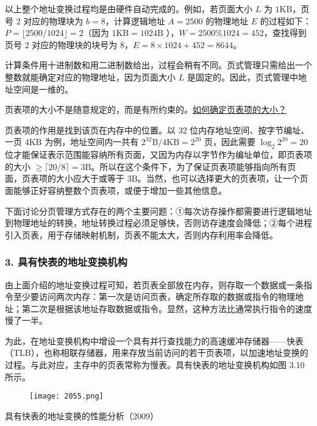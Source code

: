 \documentclass{ctexbook}
\begin{document}
	以上整个地址变换过程均是由硬件自动完成的。例如，若页面大小 \( L \) 为 \( 1\text{KB} \)，页号 \( 2 \) 对应的物理块为 \( b = 8 \)，计算逻辑地址 \( A = 2500 \) 的物理地址 \( E \) 的过程如下：\( P = \lfloor 2500 / 1024 \rfloor = 2 \)（因为 \( 1\text{KB} = 1024 \text{B} \) ），\( W = 2500 \% 1024 = 452 \)，查找得到页号 \( 2 \) 对应的物理块的块号为 \( 8 \)，\( E = 8 \times 1024 + 452 = 8644 \)。
	
	计算条件用十进制数和用二进制数给出，过程会稍有不同。页式管理只需给出一个整数就能确定对应的物理地址，因为页面大小 \( L \) 是固定的。因此，页式管理中地址空间是一维的。
	
	页表项的大小不是随意规定的，而是有所约束的。\uline{如何确定页表项的大小？}
	
	页表项的作用是找到该页在内存中的位置。以 32 位内存地址空间、按字节编址、一页 \( 4\text{KB} \) 为例，地址空间内一共有 \( 2^{32}\text{B} / 4\text{KB} = 2^{20} \) 页，因此需要 \( \log_2 2^{20} = 20 \) 位才能保证表示范围能容纳所有页面，又因为内存以字节作为编址单位，即页表项的大小 \( \geq \lceil 20 / 8 \rceil = 3\text{B} \)。所以在这个条件下，为了保证页表项能够指向所有页面，页表项的大小应大于或等于 \( 3\text{B} \)。当然，也可以选择更大的页表项，让一个页面能够正好容纳整数个页表项，或便于增加一些其他信息。
	
	下面讨论分页管理方式存在的两个主要问题：①每次访存操作都需要进行逻辑地址到物理地址的转换，地址转换过程必须足够快，否则访存速度会降低；②每个进程引入页表，用于存储映射机制，页表不能太大，否则内存利用率会降低。
	
	\subsubsection{3. 具有快表的地址变换机构}
	由上面介绍的地址变换过程可知，若页表全部放在内存，则存取一个数据或一条指令至少要访问两次内存：第一次是访问页表，确定所存取的数据或指令的物理地址；第二次是根据该地址存取数据或指令。显然，这种方法比通常执行指令的速度慢了一半。
	
	为此，在地址变换机构中增设一个具有并行查找能力的高速缓冲存储器——快表（TLB），也称相联存储器，用来存放当前访问的若干页表项，以加速地址变换的过程。与此对应，主存中的页表常称为慢表。具有快表的地址变换机构如图 3.10 所示。
	
	\begin{figure}[h]
		\centering
		\texttt{[image: 2055.png]}
		\label{fig:t2}
	\end{figure}
	
	\begin{tcolorbox}[colback=gray!10, colframe=gray!30, title={命题追踪}]
		具有快表的地址变换的性能分析（2009）
	\end{tcolorbox}
	
\end{document}
